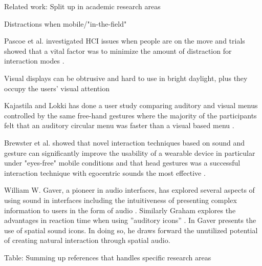 Related work: Split up in academic research areas







Distractions when mobile/"in-the-field"

Pascoe et al. investigated HCI issues when people are on the move and trials showed that a vital factor was to minimize the amount of distraction for interaction modes \cite{pascoe_using_2000}.

Visual displays can be obtrusive and hard to use in bright daylight, plus they occupy the users’ visual attention \cite{geelhoed_safety_2000}

Kajastila and Lokki has done a user study comparing auditory and visual menus controlled by the same free-hand gestures where the majority of the participants felt that an auditory circular menu was faster than a visual based menu \cite{kajastila_interaction_2013}.

Brewster et al. showed that novel interaction techniques based on sound and gesture can significantly improve the usability of a wearable device in particular under "eyes-free" mobile conditions and that head gestures was a successful interaction technique with egocentric sounds the most effective \cite{brewster_multimodaleyes-freeinteraction_2003}.

William W. Gaver, a pioneer in audio interfaces, has explored several aspects of using sound in interfaces including the intuitiveness of presenting complex information to users in the form of audio \cite{gaver_sonicfinder:_1989}. Similarly Graham explores the advantages in reaction time when using ”auditory icons” \cite{graham_use_1999}. In \cite{gaver_auditory_1986} Gaver presents the use of spatial sound icons. In doing so, he draws forward the unutilized potential of creating natural interaction through spatial audio.

Table: Summing up references that handles specific research areas




